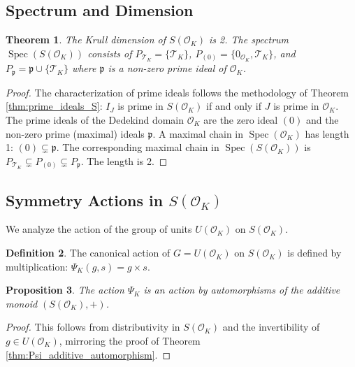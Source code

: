 \documentclass[11pt, a4paper]{article}
\theoremstyle{plain}
\newtheorem{theorem}{Theorem}[section]
\newtheorem{proposition}[theorem]{Proposition}
\theoremstyle{definition}
\newtheorem{definition}[theorem]{Definition}
\numberwithin{equation}{section}
\newcommand{\Tobj}{\mathcal{T}} %
\DeclareMathOperator{\Spec}{Spec}
\newcommand{\OK}{\mathcal{O}_K}
\newcommand{\SOK}{S(\OK)}
\begin{document}
\subsection{Spectrum and Dimension}

\begin{theorem}\label{thm:spectrum_SOK}
The Krull dimension of $\SOK$ is 2. The spectrum $\Spec(\SOK)$ consists of $P_{\Tobj_K}=\{\Tobj_K\}$, $P_{(0)}=\{0_{\OK}, \Tobj_K\}$, and $P_{\mathfrak{p}} = \mathfrak{p} \cup \{\Tobj_K\}$ where $\mathfrak{p}$ is a non-zero prime ideal of $\OK$.
\end{theorem}
\begin{proof}
The characterization of prime ideals follows the methodology of Theorem \ref{thm:prime_ideals_S}: $I_J$ is prime in $\SOK$ if and only if $J$ is prime in $\OK$.
The prime ideals of the Dedekind domain $\OK$ are the zero ideal $(0)$ and the non-zero prime (maximal) ideals $\mathfrak{p}$.
A maximal chain in $\Spec(\OK)$ has length 1: $(0) \subsetneq \mathfrak{p}$.
The corresponding maximal chain in $\Spec(\SOK)$ is $P_{\Tobj_K} \subsetneq P_{(0)} \subsetneq P_{\mathfrak{p}}$. The length is 2.
\end{proof}

\subsection{Symmetry Actions in $\SOK$}

We analyze the action of the group of units $U(\OK)$ on $\SOK$.

\begin{definition}
The canonical action of $G=U(\OK)$ on $\SOK$ is defined by multiplication: $\Psi_K(g, s) = g \times s$.
\end{definition}

\begin{proposition}
The action $\Psi_K$ is an action by automorphisms of the additive monoid $(\SOK, +)$.
\end{proposition}
\begin{proof}
This follows from distributivity in $\SOK$ and the invertibility of $g \in U(\OK)$, mirroring the proof of Theorem \ref{thm:Psi_additive_automorphism}.
\end{proof}
\end{document}
